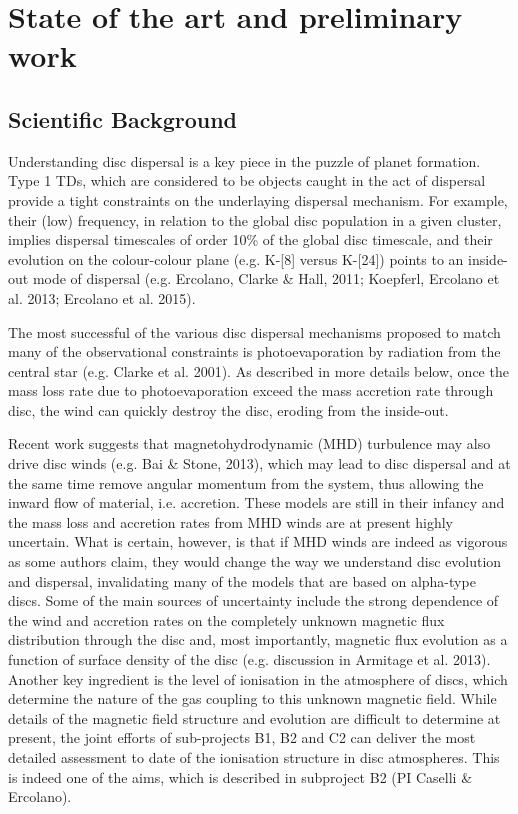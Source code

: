 \documentclass[10pt,fleqn,twoside]{article}
\newcommand{\Tcol}{\color{blue}}
\begin{document}
\section{\Tcol State of the art and preliminary work}
\renewcommand{\leftmark}{\sc State of the Art and preliminary work}

\subsection{Scientific Background}

Understanding disc dispersal is a key piece in the puzzle of planet
formation. Type 1 TDs, which are considered to be objects caught in
the act of dispersal provide a tight constraints on the underlaying
dispersal mechanism. For example, their (low) frequency, in relation
to the global disc population in a given cluster, implies dispersal
timescales of order 10\% of the global disc timescale, and their
evolution on the colour-colour plane (e.g. K-[8] versus K-[24]) points
to an inside-out mode of 
dispersal (e.g. Ercolano, Clarke \& Hall, 2011; Koepferl, Ercolano et
al. 2013; Ercolano et al. 2015). 

The most successful of the various disc dispersal mechanisms proposed to
match many of the observational constraints 
is photoevaporation by radiation from the central star
(e.g. Clarke et al. 2001). As described in more details below, once
the mass loss rate due to photoevaporation exceed the mass accretion
rate through disc, the wind can quickly destroy the disc, eroding from the inside-out.

Recent work suggests that magnetohydrodynamic (MHD) turbulence may also
drive disc winds (e.g. Bai \& Stone, 2013), which may lead to disc
dispersal and at the same time remove angular momentum from the
system, thus allowing the inward flow of material, i.e. accretion. These models are still in their infancy and the
mass loss and accretion rates from MHD winds are at present highly
uncertain. What is certain, however, is that if MHD winds are indeed
as vigorous as some authors claim, they would change the
way we understand disc evolution and dispersal, invalidating many of
the models that are based on alpha-type discs. Some of the main
sources of uncertainty include the strong dependence of the wind and
accretion rates on the completely unknown magnetic flux distribution
through the disc and, most importantly, magnetic flux evolution as a
function of surface density of the disc (e.g. discussion in Armitage
et al. 2013). Another key ingredient is the level of ionisation in the
atmosphere of discs, which determine the nature of the gas coupling to
this unknown magnetic field. While details of the magnetic field
structure and evolution are difficult to determine at present, the
joint efforts of sub-projects B1, B2 and C2 can deliver the most
detailed assessment to date of the ionisation structure in disc
atmospheres. This is indeed one of the aims, which is described in
subproject B2 (PI Caselli \& Ercolano).  
\end{document}
